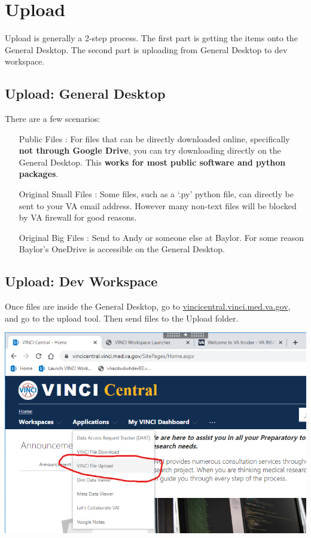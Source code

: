 \documentclass[12pt]{article}
\theoremstyle{definition}
\begin{document}
\section{Upload}
Upload is generally a 2-step process. The first part is getting the items onto the General Desktop. The second part is uploading from General Desktop to dev workspace.

\subsection{Upload: General Desktop}
There are a few scenarios:
\begin{itemize}
    \item[Public Files]: For files that can be directly downloaded online, specifically \textbf{not through Google Drive}, you can try downloading directly on the General Desktop. This \textbf{works for most public software and python packages}.
    \item[Original Small Files]: Some files, such as a `.py' python file, can directly be sent to your VA email address. However many non-text files will be blocked by VA firewall for good reasons.
    \item[Original Big Files]: Send to Andy or someone else at Baylor. For some reason Baylor's OneDrive is accessible on the General Desktop.
\end{itemize}

\subsection{Upload: Dev Workspace}
Once files are inside the General Desktop, go to \url{vincicentral.vinci.med.va.gov}, and go to the upload tool. Then send files to the Upload folder.

\includegraphics[width=\linewidth]{screenshots/vinci-upload.png}
\end{document}
